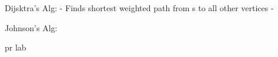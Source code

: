 Dijsktra's Alg:
- Finds shortest weighted path from s to all other vertices
- 

Johnson's Alg:

pr lab 